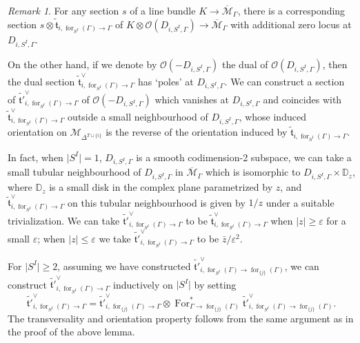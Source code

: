 \documentclass[11pt]{amsart}
\theoremstyle{definition}
\theoremstyle{remark}
\newtheorem{rmk}[dummy]{Remark}
\renewcommand{\for}{\operatorname{for}}
\newcommand{\For}{\operatorname{For}}
\newcommand{\<}{\left<}
\renewcommand{\>}{\right>}
\numberwithin{equation}{section}
\def\Mbar{{\overline{\mathcal M}}}
\begin{document}
\begin{rmk}\label{rmk divosr like section}
    For %
any section $s$ of a line bundle $K\to \Mbar_{\Gamma}$, there is a corresponding section $s \otimes \tilde{\mathfrak t }_{i,\for_{S^I}(\Gamma)\to\Gamma}$ of $K\otimes \mathcal O(D_{i,S^I,\Gamma})\to \Mbar_{\Gamma}$ with additional zero locus at $D_{i,S^I,\Gamma}$.

    On the other hand, if we denote by $\mathcal O(-D_{i,S^I,\Gamma})$ the dual of $\mathcal O(D_{i,S^I,\Gamma})$, then the dual section $\tilde{\mathfrak t }_{i,\for_{S^I}(\Gamma)\to\Gamma}^\vee$ has `poles' at $D_{i,S^I,\Gamma}$. We can construct a section of $\tilde{\mathfrak t' }_{i,\for_{S^I}(\Gamma)\to\Gamma}^\vee$ of $\mathcal O(-D_{i,S^I,\Gamma})$ which vanishes at $D_{i,S^I,\Gamma}$ and coincides with $\tilde{\mathfrak t }_{i,\for_{S^I}(\Gamma)\to\Gamma}^\vee$ outside a small neighbourhood of $D_{i,S^I,\Gamma}$, whose induced orientation on $\mathcal M_{\Delta^{T\sqcup\{i\}}}$ is the reverse of the orientation induced by $\tilde{\mathfrak t }_{i,\for_{S^I}(\Gamma)\to\Gamma}$. 
    
    In fact, when $\lvert S^I\rvert=1$, $D_{i,S^I,\Gamma}$ is a smooth codimension-2 subspace, we can take a small tubular neighbourhood of $D_{i,S^I,\Gamma}$ in $\Mbar_\Gamma$ which is isomorphic to $D_{i,S^I,\Gamma}\times \mathbb D_z$, where $\mathbb D_z$ is a small disk in the complex plane parametrized by $z$, and $\tilde{\mathfrak t }_{i,\for_{S^I}(\Gamma)\to\Gamma}^\vee$ on this tubular neighbourhood is given by $1/z$ under a suitable trivialization. We can take $\tilde{\mathfrak t' }_{i,\for_{S^I}(\Gamma)\to\Gamma}^\vee$ to be $\tilde{\mathfrak t }_{i,\for_{S^I}(\Gamma)\to\Gamma}^\vee$ when $\lvert z\rvert\ge \varepsilon$ for a small $\varepsilon$; when $\lvert z\rvert\le \varepsilon$ we take $\tilde{\mathfrak t' }_{i,\for_{S^I}(\Gamma)\to\Gamma}^\vee$ to be $\bar z/\varepsilon^2$.
    
    For $\lvert S^I\rvert\ge 2$,  assuming we have constructed $\tilde{\mathfrak t'}_{i,\for_{S^I}(\Gamma)\to\for_{\{j\}}(\Gamma)}^\vee$, we can construct $\tilde{\mathfrak t' }_{i,\for_{S^I}(\Gamma)\to\Gamma}^\vee$ inductively on $\lvert S^I\rvert$ by setting
    $$\tilde{\mathfrak t'}_{i,\for_{S^I}(\Gamma)\to\Gamma}^\vee= \tilde{\mathfrak t'}_{i,\for_{\{j\}}(\Gamma)\to\Gamma}^\vee\otimes  \For_{\Gamma\to \for_{\{j\}}(\Gamma)}^* \tilde{\mathfrak t'}_{i,\for_{S^I}(\Gamma)\to\for_{\{j\}}(\Gamma)}^\vee.$$ 
    The transversality and orientation property follows from the same argument as in the proof of the above lemma.
\end{rmk}
\end{document}
